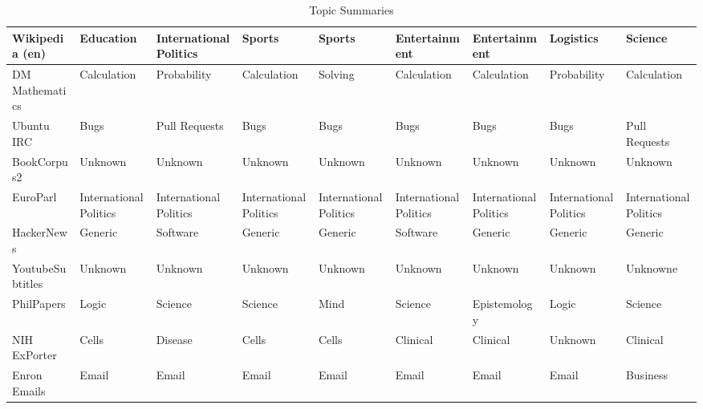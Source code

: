 \documentclass[11pt,a4paper]{article}
\begin{document}
\begin{appendices}
\begin{table}[p]
\begin{tiny}
\begin{tabular}{|p{}|p{}p{}p{}p{}p{}p{}p{}p{}|}
Wikipedia (en) & Education & International Politics & Sports & Sports & Entertainment & Entertainment & Logistics & Science\\\hline
DM Mathematics & Calculation & Probability & Calculation & Solving & Calculation & Calculation & Probability & Calculation\\\hline
Ubuntu IRC & Bugs & Pull Requests & Bugs & Bugs & Bugs & Bugs & Bugs & Pull Requests\\\hline
BookCorpus2 & Unknown & Unknown & Unknown & Unknown & Unknown & Unknown & Unknown & Unknown\\\hline
EuroParl & International Politics & International Politics & International Politics & International Politics & International Politics & International Politics & International Politics & International Politics\\\hline
HackerNews & Generic & Software & Generic & Generic & Software & Generic & Generic & Generic\\\hline
YoutubeSubtitles & Unknown & Unknown & Unknown & Unknown & Unknown & Unknown & Unknown & Unknowne\\\hline
PhilPapers & Logic & Science & Science & Mind & Science & Epistemology & Logic & Science\\\hline
NIH ExPorter & Cells & Disease & Cells & Cells & Clinical & Clinical & Unknown & Clinical\\\hline
Enron Emails & Email & Email & Email & Email & Email & Email & Email & Business\\\hline
\end{tabular}
\caption{Topic Summaries}
\end{tiny}
\end{table}


\end{appendices}
\end{document}
